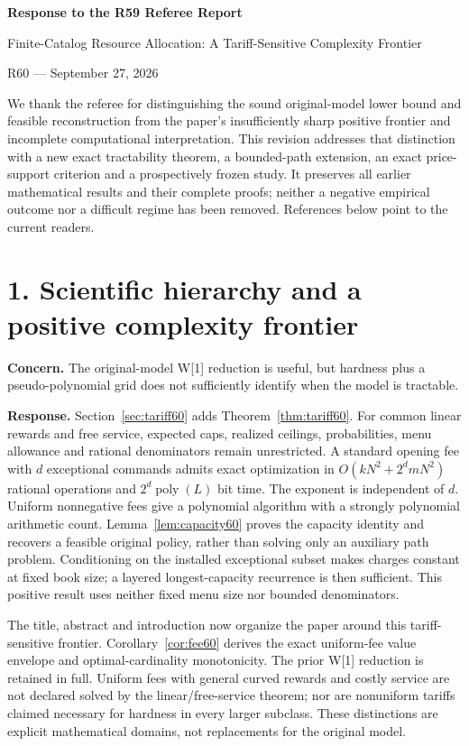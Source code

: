\documentclass[11pt,letterpaper]{article}
\theoremstyle{definition}\newtheorem{remark}[theorem]{Remark}
\begin{document}
\begin{center}{\Large\bfseries Response to the R59 Referee Report}\par Finite-Catalog Resource Allocation: A Tariff-Sensitive Complexity Frontier\par R60 --- September 27, 2026\end{center}
We thank the referee for distinguishing the sound original-model lower bound and feasible reconstruction from the paper's insufficiently sharp positive frontier and incomplete computational interpretation. This revision addresses that distinction with a new exact tractability theorem, a bounded-path extension, an exact price-support criterion and a prospectively frozen study. It preserves all earlier mathematical results and their complete proofs; neither a negative empirical outcome nor a difficult regime has been removed. References below point to the current readers.

\section*{1. Scientific hierarchy and a positive complexity frontier}
\textbf{Concern.} The original-model W[1] reduction is useful, but hardness plus a pseudo-polynomial grid does not sufficiently identify when the model is tractable.

\textbf{Response.} Section~\ref{sec:tariff60} adds Theorem~\ref{thm:tariff60}. For common linear rewards and free service, expected caps, realized ceilings, probabilities, menu allowance and rational denominators remain unrestricted. A standard opening fee with $d$ exceptional commands admits exact optimization in $O(kN^2+2^d mN^2)$ rational operations and $2^d\operatorname{poly}(L)$ bit time. The exponent is independent of $d$. Uniform nonnegative fees give a polynomial algorithm with a strongly polynomial arithmetic count. Lemma~\ref{lem:capacity60} proves the capacity identity and recovers a feasible original policy, rather than solving only an auxiliary path problem. Conditioning on the installed exceptional subset makes charges constant at fixed book size; a layered longest-capacity recurrence is then sufficient. This positive result uses neither fixed menu size nor bounded denominators.

The title, abstract and introduction now organize the paper around this tariff-sensitive frontier. Corollary~\ref{cor:fee60} derives the exact uniform-fee value envelope and optimal-cardinality monotonicity. The prior W[1] reduction is retained in full. Uniform fees with general curved rewards and costly service are not declared solved by the linear/free-service theorem; nor are nonuniform tariffs claimed necessary for hardness in every larger subclass. These distinctions are explicit mathematical domains, not replacements for the original model.
\end{document}
